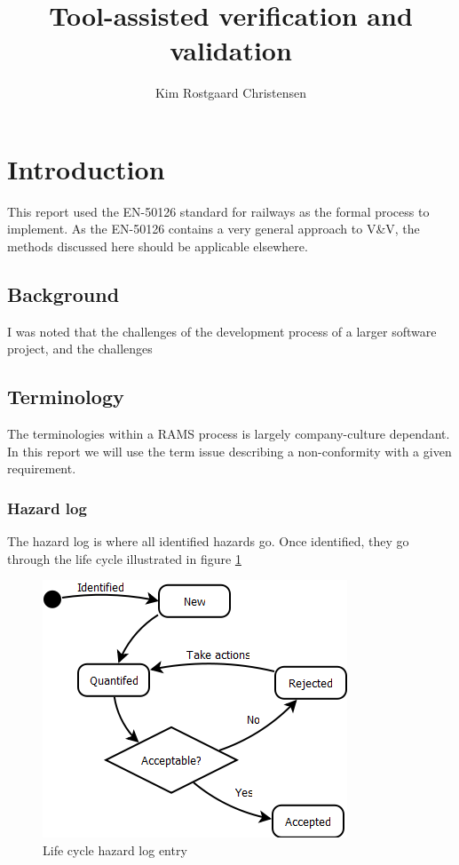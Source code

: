 \documentclass[10pt,a4paper]{article}
\author{Kim Rostgaard Christensen}
\title{Tool-assisted verification and validation}
\begin{document}
\maketitle


\tableofcontents
\newpage

\section{Introduction}
This report used the EN-50126 standard for railways as the formal process to implement. As the EN-50126 contains a very general approach to V\&V, the methods discussed here should be applicable elsewhere.

\subsection{Background}
I was noted that the challenges of the development process of a larger software project, and the challenges


\subsection{Terminology}
The terminologies within a RAMS process is largely company-culture dependant. In this report we will use the term issue describing a non-conformity with a given requirement.

\subsubsection{Hazard log}
The hazard log is where all identified hazards go. Once identified, they go through the life cycle illustrated in figure \ref{fig:hazard_log_life_cycle}

\begin{figure}[h]
\centering
\includegraphics[scale=0.45]{fig/Hazard_log_Entry_Lifecycle.png} 
\caption{Life cycle hazard log entry}
\label{fig:hazard_log_life_cycle}
\end{figure}
\end{document}
